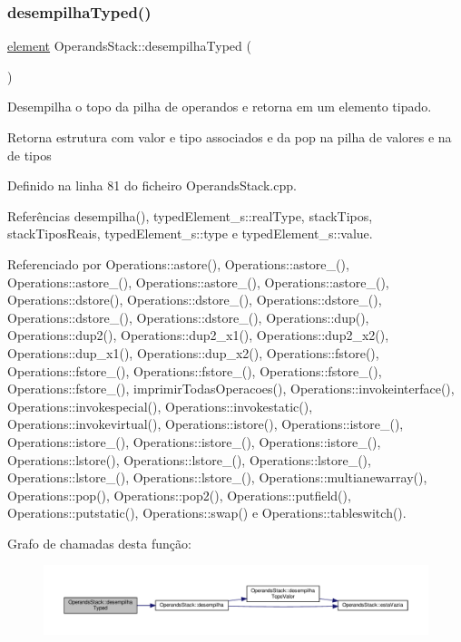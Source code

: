 \subsubsection{\texorpdfstring{desempilha\+Typed()}{desempilhaTyped()}}
{\footnotesize\ttfamily \hyperlink{unionelement}{element} Operands\+Stack\+::desempilha\+Typed (\begin{DoxyParamCaption}{ }\end{DoxyParamCaption})}



Desempilha o topo da pilha de operandos e retorna em um elemento tipado. 

Retorna estrutura com valor e tipo associados e da pop na pilha de valores e na de tipos 

Definido na linha 81 do ficheiro Operands\+Stack.\+cpp.



Referências desempilha(), typed\+Element\+\_\+s\+::real\+Type, stack\+Tipos, stack\+Tipos\+Reais, typed\+Element\+\_\+s\+::type e typed\+Element\+\_\+s\+::value.



Referenciado por Operations\+::astore(), Operations\+::astore\+\_(), Operations\+::astore\+\_(), Operations\+::astore\+\_(), Operations\+::astore\+\_(), Operations\+::dstore(), Operations\+::dstore\+\_(), Operations\+::dstore\+\_(), Operations\+::dstore\+\_(), Operations\+::dstore\+\_(), Operations\+::dup(), Operations\+::dup2(), Operations\+::dup2\+\_\+x1(), Operations\+::dup2\+\_\+x2(), Operations\+::dup\+\_\+x1(), Operations\+::dup\+\_\+x2(), Operations\+::fstore(), Operations\+::fstore\+\_(), Operations\+::fstore\+\_(), Operations\+::fstore\+\_(), Operations\+::fstore\+\_(), imprimir\+Todas\+Operacoes(), Operations\+::invokeinterface(), Operations\+::invokespecial(), Operations\+::invokestatic(), Operations\+::invokevirtual(), Operations\+::istore(), Operations\+::istore\+\_(), Operations\+::istore\+\_(), Operations\+::istore\+\_(), Operations\+::istore\+\_(), Operations\+::lstore(), Operations\+::lstore\+\_(), Operations\+::lstore\+\_(), Operations\+::lstore\+\_(), Operations\+::lstore\+\_(), Operations\+::multianewarray(), Operations\+::pop(), Operations\+::pop2(), Operations\+::putfield(), Operations\+::putstatic(), Operations\+::swap() e Operations\+::tableswitch().

Grafo de chamadas desta função\+:
\nopagebreak
\begin{figure}[H]
\begin{center}
\leavevmode
\includegraphics[width=350pt]{classOperandsStack_a9503313a7def4c11fb782d5881e3d6cb_cgraph}
\end{center}
\end{figure}
\mbox{\label{classOperandsStack_a50b642d5ff6a7a1f56b8cfc75bde1192}} 
